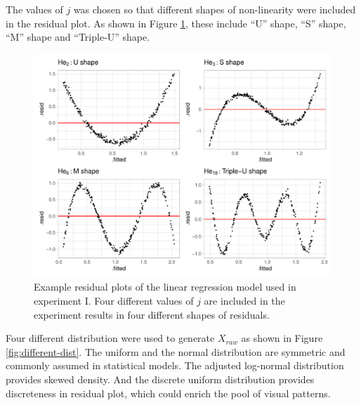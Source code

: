 \documentclass[]{interact}
\theoremstyle{plain}%
\theoremstyle{definition}
\theoremstyle{remark}
\begin{document}
The values of \(j\) was chosen so that different shapes of non-linearity
were included in the residual plot. As shown in Figure
\ref{fig:different-shape-of-herimite}, these include ``U'' shape, ``S''
shape, ``M'' shape and ``Triple-U'' shape.

\begin{figure}
\includegraphics[width=1\linewidth]{paper_comparison_files/figure-latex/different-shape-of-herimite-1} \caption{Example residual plots of the linear regression model used in experiment I. Four different values of $j$ are included in the experiment results in four different shapes of residuals.}\label{fig:different-shape-of-herimite}
\end{figure}

Four different distribution were used to generate \(X_{raw}\) as shown
in Figure \ref{fig:different-dist}. The uniform and the normal
distribution are symmetric and commonly assumed in statistical models.
The adjusted log-normal distribution provides skewed density. And the
discrete uniform distribution provides discreteness in residual plot,
which could enrich the pool of visual patterns.
\end{document}
